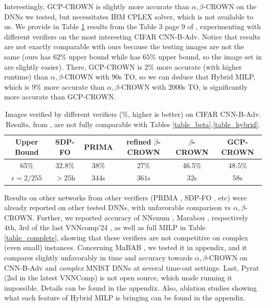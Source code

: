 Interestingly, GCP-CROWN \cite{cutting} is slightly more accurate than $\alpha,\beta$-CROWN on the DNNs we tested, but necessitates IBM CPLEX solver, which is not available to us.
We provide in Table \ref{table_gcp} results from the Table 3 page 9 of \cite{cutting}, experimenting with different verifiers on the most interesting CIFAR CNN-B-Adv. Notice that results are not exactly comparable with ours because the testing images are not the same (ours has $62\%$ upper bound while \cite{cutting} has $65\%$ upper bound, so the image set in \cite{cutting} are slightly easier). There, GCP-CROWN is $2\%$ more accurate (with higher runtime) than $\alpha,\beta$-CROWN with 90s TO, so we can deduce that Hybrid MILP, which is $9\%$ more accurate than $\alpha,\beta$-CROWN with 2000s TO, is significantly more accurate than GCP-CROWN.




\begin{table}[t!]
	\centering
	\begin{tabular}{||c||c|c|c|c|c||}
		\hline
		Upper Bound & SDP-FO & PRIMA & refined $\beta$-CROWN & $\beta$-CROWN & GCP-CROWN \\  \hline
		65\% & 32.8\% & 38\% & 27\% & 46.5\% & 48.5\% \\
		$\epsilon = 2/255$ & $>25$h & $344$s & $361$s & $32$s &  $58$s  \\  \hline
	\end{tabular}
	\caption{Images verified by different verifiers ($\%$, higher is better) on CIFAR CNN-B-Adv. Results, from \cite{cutting}, are not fully comparable with Tables \ref{table_beta},\ref{table_hybrid}.}
	\label{table_gcp}
	\vspace{-0.3cm}
\end{table}


Results on other networks from other verifiers (PRIMA \cite{prima}, SDP-FO \cite{SDPFI}, etc) were already reported \cite{CROWN} on other tested DNNs, with unfavorable comparison vs $\alpha,\beta$-CROWN. Further, we reported accuracy of NNenum \cite{nnenum}, Marabou \cite{Marabou,Marabou2}, respectively 4th, 3rd of the last VNNcomp'24 \cite{VNNcomp24}, as well as full MILP \cite{MILP} in Table \ref{table_complete}, showing that these verifiers are not competitive on complex (even small) instances. Concerning MnBAB \cite{ferrari2022complete}, we tested it in appendix, and it compares slightly unfavorably in time and accuracy towards $\alpha,\beta$-CROWN on CNN-B-Adv and {\em complex} MNIST DNNs at several time-out settings. Last, Pyrat \cite{pyrat} (2sd in the latest VNNComp) is not open source, which made running it impossible. Details can be found in the appendix. Also, ablation studies showing what each feature of Hybrid MILP is bringing can be found in the appendix.



